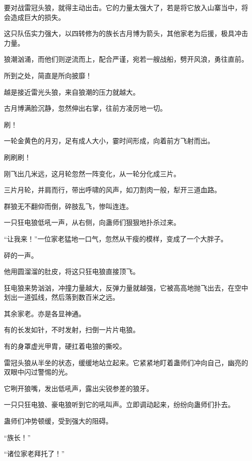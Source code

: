 
\begin{this_body}



要对战雷冠头狼，就得主动出击。它的力量太强大了，若是将它放入山寨当中，将会造成巨大的损失。

这只队伍实力强大，以四转修为的族长古月博为箭头，其他家老为后援，极具冲击力量。

狼潮汹涌，而他们则逆流而上，配合严谨，宛若一艘战船，劈开风浪，勇往直前。

所到之处，简直是所向披靡！

越是接近雷光头狼，来自狼潮的压力就越大。

古月博满脸沉静，忽然伸出右掌，往前方凌厉地一切。

刷！

一轮金黄色的月刃，足有成人大小，霎时间形成，向着前方飞射而出。

刷刷刷！

刚飞出几米远，这月轮忽然一阵变化，从一轮分化成三片。

三片月轮，并肩而行，带出呼啸的风声，如刀割肉一般，犁开三道血路。

群狼无不翻仰而倒，碎肢乱飞，惨叫连连。

一只狂电狼低吼一声，从右侧，向蛊师们狠狠地扑杀过来。

“让我来！”一位家老猛地一口气，忽然从干瘦的模样，变成了一个大胖子。

砰的一声。

他用圆溜溜的肚皮，将这只狂电狼直接顶飞。

狂电狼来势汹汹，冲撞力量越大，反弹力量就越强，它被高高地抛飞出去，在空中划出一道弧线，然后落到数百米之远。

其余家老。亦是各显神通。

有的长发如针，不时发射，扫倒一片片电狼。

有的身罩虚光甲胄，硬扛着电狼的撕咬。

雷冠头狼从半坐的状态，缓缓地站立起来。它紧紧地盯着蛊师们冲向自己，幽亮的双眼中闪过警惕的光。

它咧开狼嘴，发出低吼声，露出尖锐参差的狼牙。

一只只狂电狼、豪电狼听到它的吼叫声。立即调动起来，纷纷向蛊师们扑去。

蛊师们冲势顿缓，受到强大的阻碍。

“族长！”

“诸位家老拜托了！”


\end{this_body}
